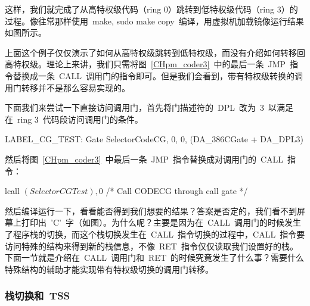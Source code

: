 这样，我们就完成了从高特权级代码（ring 0）跳转到低特权级代码（ring 3）的过程。像往常那样使用~make, sudo make copy~编译，用虚拟机加载镜像运行结果如图所示。

上面这个例子仅仅演示了如何从高特权级跳转到低特权级，而没有介绍如何转移回高特权级。理论上来讲，我们只需将图~\ref{CHpm_coder3}~中的最后一条~JMP~指令替换成一条~CALL~调用门的指令即可。但是我们会看到，带有特权级转换的调用门转移并不是那么容易实现的。

下面我们来尝试一下直接访问调用门，首先将门描述符的~DPL~改为~3~以满足在~ring 3~代码段访问调用门的条件。

\begin{Command}
LABEL_CG_TEST:      Gate    SelectorCodeCG, 0, 0, (DA_386CGate + DA_DPL3)
\end{Command}

然后将图~\ref{CHpm_coder3}~中最后一条~JMP~指令替换成对调用门的~CALL~指令：

\begin{Command}
lcall   $(SelectorCGTest), $0  /* Call CODECG through call gate */
\end{Command}

然后编译运行一下，看看能否得到我们想要的结果？答案是否定的，我们看不到屏幕上打印出~'C'~字（如图）。为什么呢？主要是因为在~CALL~调用门的时候发生了程序栈的切换，而这个栈切换发生在~CALL~指令切换的过程中，CALL~指令要访问特殊的结构来得到新的栈信息，不像~RET~指令仅仅读取我们设置好的栈。下面一节就是介绍在~CALL~调用门和~RET~的时候究竟发生了什么事？需要什么特殊结构的辅助才能实现带有特权级切换的调用门转移。

\subsubsection{栈切换和~TSS}